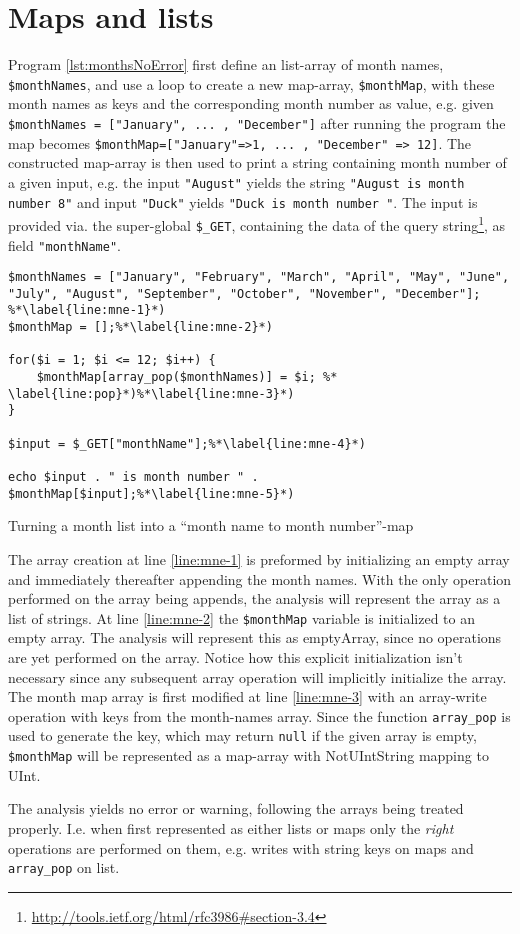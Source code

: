 \section{Maps and lists}


Program \ref{lst:monthsNoError} first define an list-array of month names, \texttt{\$monthNames}, and use a loop to create a new map-array, \texttt{\$monthMap}, with these month names as keys and the corresponding month number as value, e.g. given \texttt{\$monthNames = ["January", ... , "December"]} after running the program the map becomes \texttt{\$monthMap=["January"=>1, ... , "December" => 12]}. The constructed map-array is then used to print a string containing month number of a given input, e.g. the input \texttt{"August"} yields the string \texttt{"August is month number 8"} and input \texttt{"Duck"} yields \texttt{"Duck is month number "}. The input is provided via. the super-global \texttt{\$\_GET}, containing the data of the query string\footnote{\url{http://tools.ietf.org/html/rfc3986\#section-3.4}}, as field \texttt{"monthName"}. 


\begin{program}
\begin{lstlisting}
$monthNames = ["January", "February", "March", "April", "May", "June", "July", "August", "September", "October", "November", "December"]; %*\label{line:mne-1}*)
$monthMap = [];%*\label{line:mne-2}*)

for($i = 1; $i <= 12; $i++) {
	$monthMap[array_pop($monthNames)] = $i; %* \label{line:pop}*)%*\label{line:mne-3}*)
}

$input = $_GET["monthName"];%*\label{line:mne-4}*)

echo $input . " is month number " . $monthMap[$input];%*\label{line:mne-5}*)
\end{lstlisting}
\caption{Turning a month list into a ``month name to month number''-map}
\label{lst:monthsNoError}
\end{program}

The array creation at line \ref{line:mne-1} is preformed by initializing an empty array and immediately thereafter appending the month names. With the only operation performed on the array being appends, the analysis will represent the array as a list of strings. At line \ref{line:mne-2} the \texttt{\$monthMap} variable is initialized to an empty array. The analysis will represent this as emptyArray, since no operations are yet performed on the array. Notice how this explicit initialization isn't necessary since any subsequent array operation will implicitly initialize the array. The month map array is first modified at line \ref{line:mne-3} with an array-write operation with keys from the month-names array. Since the function \texttt{array\_pop} is used to generate the key, which may return \texttt{null} if the given array is empty, \texttt{\$monthMap} will be represented as a map-array with NotUIntString mapping to UInt. 

The analysis yields no error or warning, following the arrays being treated properly. I.e. when first represented as either lists or maps only the \emph{right} operations are performed on them, e.g. writes with string keys on maps and \texttt{array\_pop} on list.  
